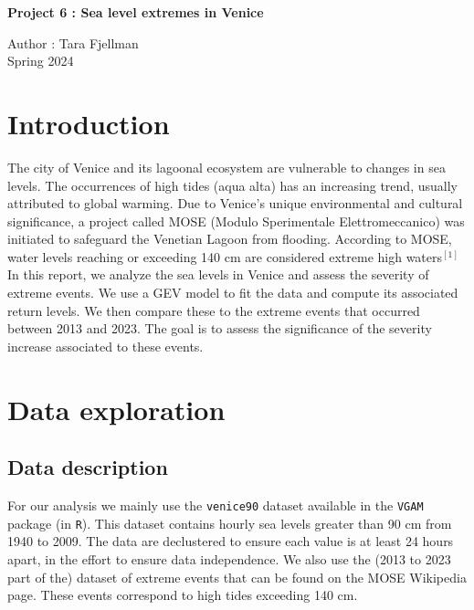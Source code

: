 \documentclass[a4paper, 12pt,oneside]{article}
\begin{document}
 
	\begin{center}
	    \Large
	    \textbf{Project 6 : Sea level extremes in Venice}
	    \vspace{0.4cm}
	    \large
        
	    Author : Tara Fjellman \\
	    \small{Spring 2024}
	\end{center}
    \section{Introduction}
    The city of Venice and its lagoonal ecosystem are vulnerable to changes in sea levels. The occurrences of high tides (aqua alta) has an increasing trend, usually attributed to global warming. Due to Venice's unique environmental and cultural significance, a project called MOSE (Modulo Sperimentale Elettromeccanico) was initiated to safeguard the Venetian Lagoon from flooding. According to MOSE, water levels reaching or exceeding 140 cm are considered extreme high waters$^{[1]}$ In this report, we analyze the sea levels in Venice and assess the severity of extreme events. We use a GEV model to fit the data and compute its associated  return levels. We then compare these to the extreme events that occurred between 2013 and 2023. The goal is to assess the significance of the severity increase associated to these events. 
    \section{Data exploration}
        \subsection{Data description}
        For our analysis we mainly use the \texttt{venice90} dataset available in the \texttt{VGAM} package (in \texttt{R}). This dataset contains hourly sea levels greater than 90 cm from 1940 to 2009. The data are declustered to ensure each value is at least 24 hours apart, in the effort to ensure data independence. We also use the (2013 to 2023 part of the) dataset of extreme events that can be found on the MOSE Wikipedia page. These events correspond to high tides exceeding 140 cm.
\end{document}

